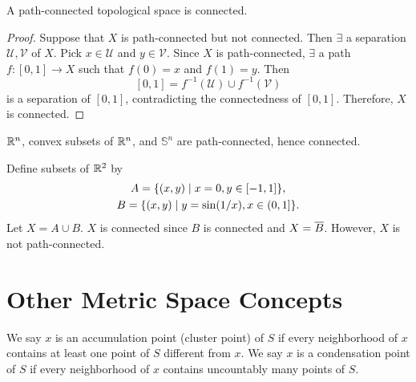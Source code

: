 \begin{thm}
    A path-connected topological space is connected.
    \begin{proof}
        Suppose that $X$ is path-connected but not connected. Then $\exists$ a separation $\mathcal U, \mathcal V$ of $X$. Pick $x\in \mathcal U$ and $y\in \mathcal V$. Since $X$ is path-connected, $\exists$ a path $f: [0, 1] \to X$ such that $f(0) = x$ and $f(1) = y$. Then
        \[
        [0, 1] = f^{-1}(\mathcal U) \cup f^{-1}(\mathcal V)
        \]
        is a separation of $[0, 1]$, contradicting the connectedness of $[0, 1]$. Therefore, $X$ is connected.
    \end{proof}
\end{thm}

\begin{ex}
    $\R^n$, convex subsets of $\R^n$, and $\mathbb S^n$ are path-connected, hence connected.
\end{ex}

\begin{ex}
    Define subsets of $\R^2$ by
    \begin{gather*}
        A = \set{(x, y) \mid x = 0, y \in [-1, 1]}, \\
        B = \set{(x, y) \mid y = \sin(1/x), x \in (0, 1]}.
    \end{gather*}
    Let $X = A \cup B$. $X$ is connected since $B$ is connected and $X = \Bar B$. However, $X$ is not path-connected. 
\end{ex}

\section{Other Metric Space Concepts}

\begin{df}
    We say $x$ is an accumulation point (cluster point) of $S$ if every neighborhood of $x$ contains at least one point of $S$ different from $x$. We say $x$ is a condensation point of $S$ if every neighborhood of $x$ contains uncountably many points of $S$.
\end{df}

